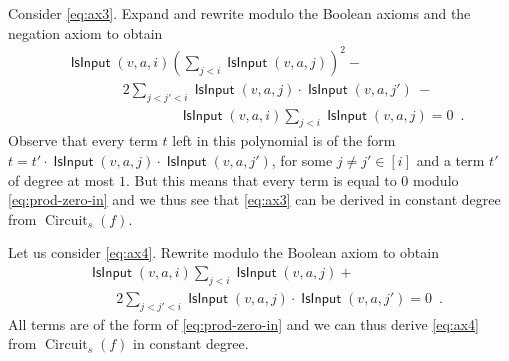 \documentclass[10pt,a4paper]{article}
\theoremstyle{plain}
\theoremstyle{remark}
\theoremstyle{definition}
\newcommand{\eqperiod}{\enspace .}
\newcommand{\vars}[1]{\mathsf{#1}}
\DeclareMathOperator{\circuit}{Circuit}
\DeclareMathOperator{\isvar}{\vars{IsInput}}
\begin{document}
Consider \cref{eq:ax3}. Expand and rewrite modulo the Boolean axioms
and the negation axiom to obtain
\begin{align}
  &\isvar(v,a,i)
  \left(\sum_{j < i} \isvar(v,a,j)\right)^2-\nonumber\\
  &\qquad\qquad 2\sum_{j < j' < i}\isvar(v,a,j)\cdot\isvar(v,a,j')~-\nonumber\\
  &\qquad\qquad\qquad\qquad\isvar(v,a,i)\sum_{j < i}\isvar(v,a,j)
  = 0 \eqperiod
\end{align}
Observe that every term $t$ left in this polynomial is of the form
$t = t' \cdot \isvar(v,a,j) \cdot \isvar(v,a,j')$, for some
$j \neq j'\in [i]$ and a term $t'$ of degree at most $1$. But this
means that every term is equal to $0$ modulo \cref{eq:prod-zero-in}
and we thus see that \cref{eq:ax3} can be derived in constant degree
from $\circuit_s(f)$.

Let us consider \cref{eq:ax4}. Rewrite modulo the Boolean axiom to
obtain
\begin{align}
  &\isvar(v,a,i)\sum_{j < i}\isvar(v,a,j) +\nonumber\\
  &\qquad 2 \sum_{j < j' < i}\isvar(v,a,j)\cdot \isvar(v,a,j')
  = 0 \eqperiod
\end{align}
All terms are of the form of \cref{eq:prod-zero-in} and we can thus
derive \cref{eq:ax4} from $\circuit_s(f)$ in constant degree.
\end{document}
